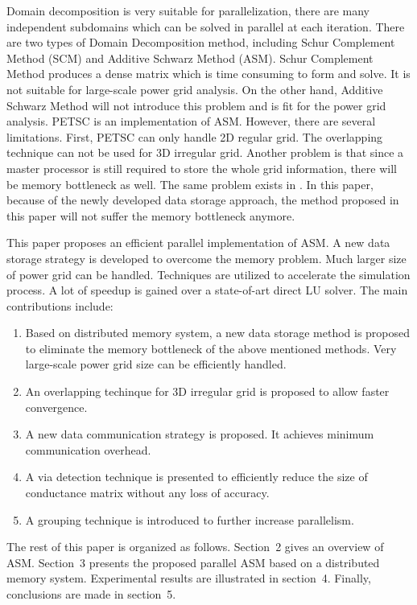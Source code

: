 \documentclass{sig-alternate}
\begin{document}
	Domain decomposition is very suitable for parallelization, there are many independent subdomains which can be
	solved in parallel at each iteration. There are two types of Domain Decomposition method, including Schur Complement Method (SCM) 
	and Additive Schwarz Method (ASM). Schur Complement Method produces a dense matrix which is time consuming to form and solve. It
	is not suitable for large-scale power grid analysis. On the other hand, Additive Schwarz Method will not introduce this problem 
	and is fit for the power grid analysis. PETSC\cite{PETSC_website} is an implementation of ASM.
	However, there are several limitations. First, PETSC can only handle 2D regular grid. 
	The overlapping technique can not be used for 3D irregular grid. Another problem is that since a master processor is 
	still required to store the whole grid information, there will be memory bottleneck as well. The same problem exists in 
	\cite{kaisun, voronov}. In this paper, because of the newly developed data storage approach, the method proposed in this paper 
	will not suffer the memory bottleneck anymore.
	
	This paper proposes an efficient parallel implementation of ASM. A new data storage strategy is developed to overcome the 
	memory problem. Much 
	larger size of power grid can be handled. Techniques are utilized to accelerate the simulation process. A lot of 
	speedup is gained over a state-of-art direct LU solver. The main contributions include:
	\begin{enumerate}[1)]
	\item Based on distributed memory system, a new data storage method is proposed to eliminate the memory bottleneck of
	the above mentioned methods. Very large-scale power grid size can be efficiently handled.
	\item An overlapping techinque for 3D irregular grid is proposed to allow faster convergence. 
	\item A new data communication strategy is proposed. It achieves minimum communication overhead.
	\item A via detection technique is presented to efficiently reduce the size of conductance matrix without any loss of accuracy.
	\item A grouping technique is introduced to further increase parallelism.
	\end{enumerate}

	The rest of this paper is organized as follows. Section~2 gives an overview of ASM. Section~3 presents 
	the proposed parallel ASM based on a distributed memory system. Experimental results are illustrated in section~4. 
	Finally, conclusions are made in section~5.
\end{document}
